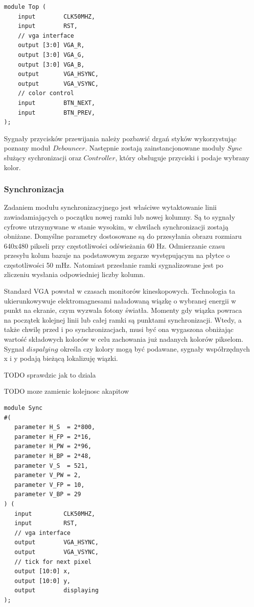 \documentclass[a4paper,12pt]{article}
\begin{document}
\begin{lstlisting}[label=Topvga,caption=Top.v]
module Top (
    input        CLK50MHZ,
    input        RST,
    // vga interface
    output [3:0] VGA_R,
    output [3:0] VGA_G,
    output [3:0] VGA_B,
    output       VGA_HSYNC,
    output       VGA_VSYNC,
    // color control
    input        BTN_NEXT,
    input        BTN_PREV,
);
\end{lstlisting}

Sygnały przycisków przewijania należy pozbawić drgań styków wykorzystując poznany moduł $Debouncer$. Następnie zostają zainstancjonowane moduły $Sync$ służący sychronizacji oraz $Controller$, który obsługuje przyciski i podaje wybrany kolor.

\subsubsection{Synchronizacja}
Zadaniem modułu synchronizacyjnego jest właściwe wytaktowanie linii zawiadamiających o początku nowej ramki lub nowej kolumny. Są to sygnały cyfrowe utrzymywane w stanie wysokim, w chwilach synchronizacji zostają obniżane. Domyślne parametry dostosowane są do przesyłania obrazu rozmiaru 640x480 pikseli przy częstotliwości odświeżania 60 Hz. Odmierzanie czasu przesyłu kolum  bazuje na podstawowym zegarze występującym na płytce o częstotliwości 50 mHz. Natomiast przesłanie ramki sygnalizowane jest po zliczeniu wysłania odpowiedniej liczby kolumn.

Standard VGA powstał w czasach monitorów kineskopowych. Technologia ta ukierunkowywuje elektromagnesami naładowaną wiązkę o wybranej energii w punkt na ekranie, czym wyzwala fotony światła. Momenty gdy wiązka powraca na początek kolejnej linii lub całej ramki są punktami synchronizacji. Wtedy, a także chwilę przed i po synchronizacjach, musi być ona wygaszona obniżając wartość składowych kolorów w celu zachowania już nadanych kolorów pikselom. Sygnał $dispalying$ określa czy kolory mogą być podawane, sygnały współrzędnych x i y podają bieżącą lokalizuję wiązki.

TODO sprawdzic jak to dziala

TODO moze zamienic kolejnosc akapitow
\begin{lstlisting}[label=Syncvga,caption=Sync.v]
module Sync
#(
   parameter H_S  = 2*800,
   parameter H_FP = 2*16,
   parameter H_PW = 2*96,
   parameter H_BP = 2*48,
   parameter V_S  = 521,
   parameter V_PW = 2,
   parameter V_FP = 10,
   parameter V_BP = 29
) (
   input         CLK50MHZ,
   input         RST,
   // vga interface
   output        VGA_HSYNC,
   output        VGA_VSYNC,
   // tick for next pixel
   output [10:0] x,
   output [10:0] y,
   output        displaying
);
\end{lstlisting}
\end{document}

